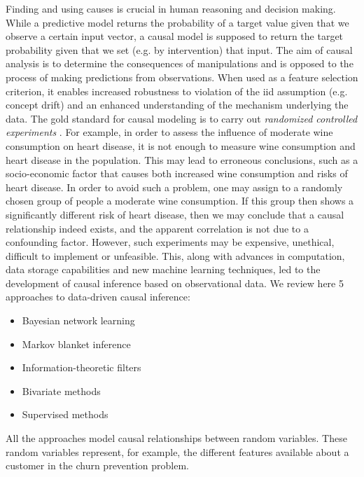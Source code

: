 Finding and using causes is crucial in human reasoning and decision making.
While a predictive model returns the probability of a target value given that we
observe a certain input vector, a causal model is supposed to return the target
probability given that we set (e.g. by intervention) that input. The aim of
causal analysis is to determine the consequences of manipulations and is opposed
to the process of making predictions from observations. When used as a feature
selection criterion, it enables increased robustness to violation of the iid
assumption (e.g. concept drift) \parencite{guyon2007causal} and an enhanced
understanding of the mechanism underlying the data. The gold standard for causal
modeling is to carry out  \emph{randomized controlled experiments}
\parencite{fisher1937design}. For example, in order to assess the influence of
moderate wine consumption on heart disease, it is not enough to measure wine
consumption and heart disease in the population. This may lead to erroneous
conclusions, such as a socio-economic factor that causes both increased wine
consumption and risks of heart disease. In order to avoid such a problem, one
may assign to a randomly chosen group of people a moderate wine consumption. If
this group then shows a significantly different risk of heart disease, then we
may conclude that a causal relationship indeed exists, and the apparent
correlation is not due to a confounding factor. However, such experiments may be
expensive, unethical, difficult to implement or unfeasible. This, along with
advances in computation, data storage capabilities and new machine learning
techniques, led to the development of causal inference based on observational
data. We review here 5 approaches to data-driven causal inference:

\begin{itemize}
    \item Bayesian network learning
    \item Markov blanket inference
    \item Information-theoretic filters
    \item Bivariate methods
    \item Supervised methods
\end{itemize}

All the approaches model causal relationships between random variables. These
random variables represent, for example, the different features available about
a customer in the churn prevention problem.

